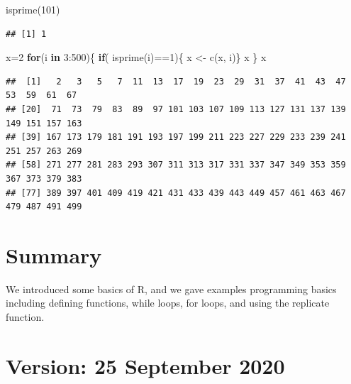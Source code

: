 \documentclass[
]{article}
\newenvironment{Shaded}{\begin{snugshade}}{\end{snugshade}}
\newcommand{\ControlFlowTok}[1]{\textcolor[rgb]{0.13,0.29,0.53}{\textbf{#1}}}
\newcommand{\DecValTok}[1]{\textcolor[rgb]{0.00,0.00,0.81}{#1}}
\newcommand{\FunctionTok}[1]{\textcolor[rgb]{0.00,0.00,0.00}{#1}}
\newcommand{\NormalTok}[1]{#1}
\newcommand{\OtherTok}[1]{\textcolor[rgb]{0.56,0.35,0.01}{#1}}
\newcommand{\SpecialCharTok}[1]{\textcolor[rgb]{0.00,0.00,0.00}{#1}}
\theoremstyle{definition}
\theoremstyle{definition}
\theoremstyle{definition}
\theoremstyle{remark}
\begin{document}
\begin{Shaded}
\begin{Highlighting}[]
\FunctionTok{isprime}\NormalTok{(}\DecValTok{101}\NormalTok{)}
\end{Highlighting}
\end{Shaded}

\begin{verbatim}
## [1] 1
\end{verbatim}

\begin{Shaded}
\begin{Highlighting}[]
\NormalTok{x}\OtherTok{=}\DecValTok{2}
 \ControlFlowTok{for}\NormalTok{(i }\ControlFlowTok{in} \DecValTok{3}\SpecialCharTok{:}\DecValTok{500}\NormalTok{)\{}
\ControlFlowTok{if}\NormalTok{( }\FunctionTok{isprime}\NormalTok{(i)}\SpecialCharTok{==}\DecValTok{1}\NormalTok{)\{}
\NormalTok{x }\OtherTok{\textless{}{-}} \FunctionTok{c}\NormalTok{(x, i)\}}
\NormalTok{ x}
\NormalTok{\}}
\NormalTok{x}
\end{Highlighting}
\end{Shaded}

\begin{verbatim}
##  [1]   2   3   5   7  11  13  17  19  23  29  31  37  41  43  47  53  59  61  67
## [20]  71  73  79  83  89  97 101 103 107 109 113 127 131 137 139 149 151 157 163
## [39] 167 173 179 181 191 193 197 199 211 223 227 229 233 239 241 251 257 263 269
## [58] 271 277 281 283 293 307 311 313 317 331 337 347 349 353 359 367 373 379 383
## [77] 389 397 401 409 419 421 431 433 439 443 449 457 461 463 467 479 487 491 499
\end{verbatim}

\hypertarget{summary}{%
\section{Summary}\label{summary}}

We introduced some basics of R, and we gave examples programming basics including defining functions, while loops, for loops, and using the replicate function.

\hypertarget{version-25-september-2020}{%
\section{Version: 25 September 2020}\label{version-25-september-2020}}
\end{document}
